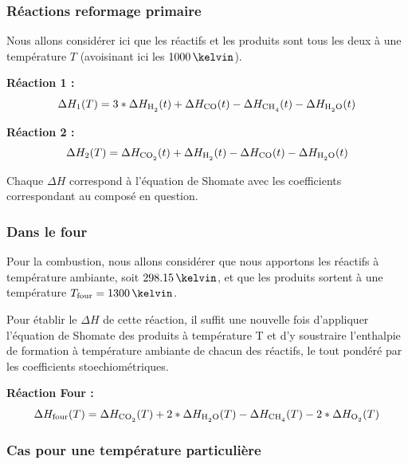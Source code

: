 \documentclass[a4paper,12pt]{article}
\begin{document}
\subsubsection{Réactions reformage primaire}

Nous allons considérer ici que les réactifs et les produits sont tous les deux
à une température $T$ (avoisinant ici les $1000\,\kelvin$).

\textbf{Réaction 1 :} 
\begin{equation*}
\Delta H_1 (T) = 3*\Delta H_{\ce{H2}} (t)
+ \Delta H_{\ce{CO}} (t)
- \Delta H_{\ce{CH4}} (t)
- \Delta H_{\ce{H2O}} (t)
\end{equation*}

\textbf{Réaction 2 :} 
\begin{equation*}
\Delta H_2 (T) = \Delta H_{\ce{CO2}} (t)
+ \Delta H_{\ce{H2}} (t)
- \Delta H_{\ce{CO}} (t)
- \Delta H_{\ce{H2O}} (t)
\end{equation*}

Chaque $\Delta H$ correspond à l’équation de Shomate
avec les coefficients correspondant au composé en question.

\subsubsection{Dans le four}

Pour la combustion, nous allons considérer que nous apportons les réactifs
à température ambiante, soit $298.15\,\kelvin$,
et que les produits sortent à une température $T\ind{four}=1300\,\kelvin$.

Pour établir le $\Delta H$ de cette réaction,
il suffit une nouvelle fois d’appliquer l’équation de Shomate des produits à température T
et d’y soustraire l’enthalpie de formation à température ambiante de chacun des réactifs,
le tout pondéré par les coefficients stoechiométriques.

\textbf{Réaction Four :} 
\begin{equation*}
\Delta H\ind{four}(T) = \Delta H_{\ce{CO2}} (T)
+ 2*\Delta H_{\ce{H2O}} (T)
- \Delta H\ind{\ce{CH4}}(T)
- 2*\Delta H\ind{\ce{O2}}(T)
\end{equation*}

\subsubsection{Cas pour une température particulière}
\end{document}
